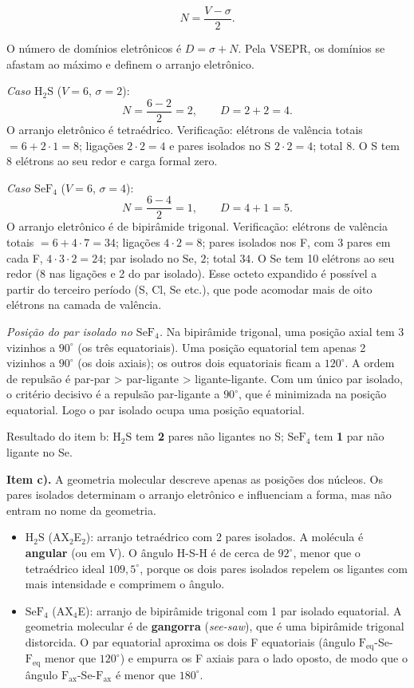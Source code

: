 \documentclass{article}%
\begin{document}
\[
N=\frac{V-\sigma}{2}.
\]

O número de domínios eletrônicos é $D=\sigma+N$. Pela VSEPR, os domínios se afastam ao máximo e definem o arranjo eletrônico.

\textit{Caso $\mathrm{H_2S}$} ($V=6$, $\sigma=2$):
\[
N=\frac{6-2}{2}=2, \qquad D=2+2=4 .
\]
O arranjo eletrônico é tetraédrico. Verificação: elétrons de valência totais $=6+2\cdot 1=8$; ligações $2\cdot 2=4$ e pares isolados no S $2\cdot 2=4$; total $8$. O S tem 8 elétrons ao seu redor e carga formal zero.

\textit{Caso $\mathrm{SeF_4}$} ($V=6$, $\sigma=4$):
\[
N=\frac{6-4}{2}=1, \qquad D=4+1=5 .
\]
O arranjo eletrônico é de bipirâmide trigonal. Verificação: elétrons de valência totais $=6+4\cdot 7=34$; ligações $4\cdot 2=8$; pares isolados nos F, com 3 pares em cada F, $4\cdot 3\cdot 2=24$; par isolado no Se, $2$; total $34$. O Se tem 10 elétrons ao seu redor (8 nas ligações e 2 do par isolado). Esse octeto expandido é possível a partir do terceiro período (S, Cl, Se etc.), que pode acomodar mais de oito elétrons na camada de valência.

\textit{Posição do par isolado no $\mathrm{SeF_4}$.} Na bipirâmide trigonal, uma posição axial tem 3 vizinhos a $90^{\circ}$ (os três equatoriais). Uma posição equatorial tem apenas 2 vizinhos a $90^{\circ}$ (os dois axiais); os outros dois equatoriais ficam a $120^{\circ}$. A ordem de repulsão é par-par > par-ligante > ligante-ligante. Com um único par isolado, o critério decisivo é a repulsão par-ligante a $90^{\circ}$, que é minimizada na posição equatorial. Logo o par isolado ocupa uma posição equatorial.

Resultado do item b: $\mathrm{H_2S}$ tem \textbf{2} pares não ligantes no S; $\mathrm{SeF_4}$ tem \textbf{1} par não ligante no Se.

\textbf{Item c).} A geometria molecular descreve apenas as posições dos núcleos. Os pares isolados determinam o arranjo eletrônico e influenciam a forma, mas não entram no nome da geometria.

\begin{itemize}
\item $\mathrm{H_2S}$ (AX$_2$E$_2$): arranjo tetraédrico com 2 pares isolados. A molécula é \textbf{angular} (ou em V). O ângulo H-S-H é de cerca de $92^{\circ}$, menor que o tetraédrico ideal $109{,}5^{\circ}$, porque os dois pares isolados repelem os ligantes com mais intensidade e comprimem o ângulo.
\item $\mathrm{SeF_4}$ (AX$_4$E): arranjo de bipirâmide trigonal com 1 par isolado equatorial. A geometria molecular é de \textbf{gangorra} (\textit{see-saw}), que é uma bipirâmide trigonal distorcida. O par equatorial aproxima os dois F equatoriais (ângulo $\mathrm{F_{eq}}$-Se-$\mathrm{F_{eq}}$ menor que $120^{\circ}$) e empurra os F axiais para o lado oposto, de modo que o ângulo $\mathrm{F_{ax}}$-Se-$\mathrm{F_{ax}}$ é menor que $180^{\circ}$.
\end{itemize}
\end{document}
